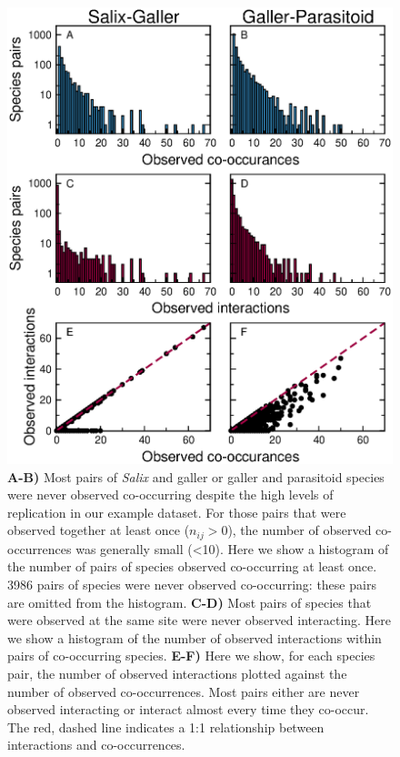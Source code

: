 \documentclass[12pt]{article}
\begin{document}
    \begin{figure}
      \caption{\textbf{A-B)} Most pairs of \emph{Salix} and galler or galler and parasitoid species were never observed co-occurring despite the high levels of replication in our example dataset. For those pairs that were observed together at least once ($n_{ij}>0$), the number of observed co-occurrences was generally small (\textless10). Here we show a histogram of the number of pairs of species observed co-occurring at least once. 3986 pairs of species were never observed co-occurring: these pairs are omitted from the histogram. \textbf{C-D)} Most pairs of species that were observed at the same site were never observed interacting. Here we show a histogram of the number of observed interactions within pairs of co-occurring species. \textbf{E-F)} Here we show, for each species pair, the number of observed interactions plotted against the number of observed co-occurrences. Most pairs either are never observed interacting or interact almost every time they co-occur. The red, dashed line indicates a 1:1 relationship between interactions and co-occurrences.}
      \label{histograms}
      \includegraphics*[width=.8\textwidth]{figures/Salix_Galler_histogram.eps}
      \end{figure}
\end{document}
